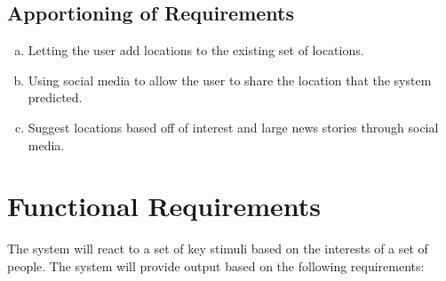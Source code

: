 \documentclass[titlepage]{article}
\newcounter{req}
\begin{document}
		\subsection{Apportioning of Requirements}
		\label{sub:apportioning_of_requirements}
		\begin{enumerate}[a)]
			\item Letting the user add locations to the existing set of locations.
			\item Using social media to allow the user to share the location that the system predicted.
			\item Suggest locations based off of interest and large news stories through social media.
			
		\end{enumerate}
		
		\section{Functional Requirements}
		\label{sec:functional_requirements}
		
		The system will react to a set of key stimuli based on the interests of a set of people. The system will provide output based on the following requirements:
		
\end{document}

